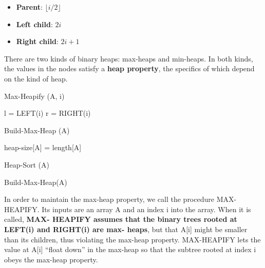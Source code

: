 \begin{itemize}
    \item \textbf{Parent}: $\lfloor i/2 \rfloor$
    \item \textbf{Left child}: $2i$
    \item \textbf{Right child}: $2i + 1$
\end{itemize}

There are two kinds of binary heaps: max-heaps and min-heaps. In both kinds,
the values in the nodes satisfy a \textbf{heap property}, the specifics of which depend on
the kind of heap.


\begin{algorithm}[H]
    \caption{Max-Heapify (A, i)}
    l = LEFT(i)\;
    r = RIGHT(i)\;
\end{algorithm}

\begin{algorithm}[H]
    \caption{Build-Max-Heap (A)}
    heap-size[A] = length[A]\;
\end{algorithm}

\begin{algorithm}[H]
    \caption{Heap-Sort (A)}
    Build-Max-Heap(A)\; 
\end{algorithm}
\newpage

In order to maintain the max-heap property, we call the procedure MAX-HEAPIFY.
Its inputs are an array A and an index i into the array. When it is called, \textbf{MAX-
HEAPIFY assumes that the binary trees rooted at LEFT(i) and RIGHT(i) are max-
heaps}, but that A[i] might be smaller than its children, thus violating the max-heap
property. MAX-HEAPIFY lets the value at A[i] “float down” in the max-heap so
that the subtree rooted at index i obeys the max-heap property.

